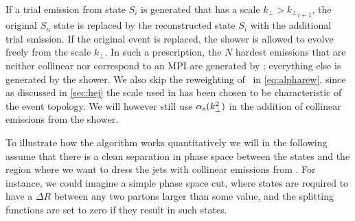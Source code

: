 If a trial emission from state $S_i$ is generated that has 
a scale $k_\perp > {k_\perp}_{i+1}$, the original
$S_n$ state is replaced by the reconstructed state $S_i$ with the
additional trial emission. If the original event is replaced, the
shower is allowed to evolve freely from the scale $k_\perp$.  In such
a prescription, the $N$ hardest emissions that are neither collinear
nor correspond to an MPI are generated by \HEJ; everything else is
generated by the shower.  We also skip the reweighting of \as\ in
\cref{eq:alpharew}, since as discussed in \cref{sec:hej} the scale
used in \HEJ has been chosen to be characteristic of the event
topology.  We will however still use $\alpha_s(k_\perp^2)$ in the addition
of collinear emissions from the shower.

\def\kti#1{\ensuremath{{k^2_\perp}_{#1}}}
% 
To illustrate how the
  algorithm works quantitatively we will in the following assume that
  there is a clean separation in phase space between the \HEJ states
  and the region where we want to dress the jets with collinear
  emissions from \pyt. For instance, we could imagine a simple phase space
  cut, where \HEJ states are required to have a $\Delta R$ between any two partons
  larger than some value, and the \pyt splitting functions are set to
  zero if they result in such states.

